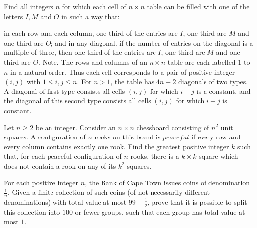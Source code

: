 \begin{problem}
[IMO2016PL2]
Find all integers $n$ for which each cell of $n \times n$ table can be filled with one of the letters $I,M$ and $O$ in such a way that:

in each row and each column, one third of the entries are $I$, one third are $M$ and one third are $O$; and
in any diagonal, if the number of entries on the diagonal is a multiple of three, then one third of the entries are $I$, one third are $M$ and one third are $O$.
Note. The rows and columns of an $n \times n$ table are each labelled $1$ to $n$ in a natural order. Thus each cell corresponds to a pair of positive integer $(i,j)$ with $1 \le i,j \le n$. For $n>1$, the table has $4n-2$ diagonals of two types. A diagonal of first type consists all cells $(i,j)$ for which $i+j$ is a constant, and the diagonal of this second type consists all cells $(i,j)$ for which $i-j$ is constant.

\end{problem}

\begin{problem}
[IMO2014PL2]
Let $n\ge2$ be an integer. Consider an $n\times n$ chessboard consisting of $n^2$ unit squares. A configuration of $n$ rooks on this board is $\textit{peaceful}$ if every row and every column contains exactly one rook. Find the greatest positive integer $k$ such that, for each peaceful configuration of $n$ rooks, there is a $k\times k$ square which does not contain a rook on any of its $k^2$ squares.

\end{problem}

\begin{problem}
[IMO2014PL5]
For each positive integer $n$, the Bank of Cape Town issues coins of denomination $\tfrac{1}{n}$. Given a finite collection of such coins (of not necessarily different denominations) with total value at most $99+\tfrac{1}{2}$, prove that it is possible to split this collection into $100$ or fewer groups, such that each group has total value at most $1$.

\end{problem}

%

